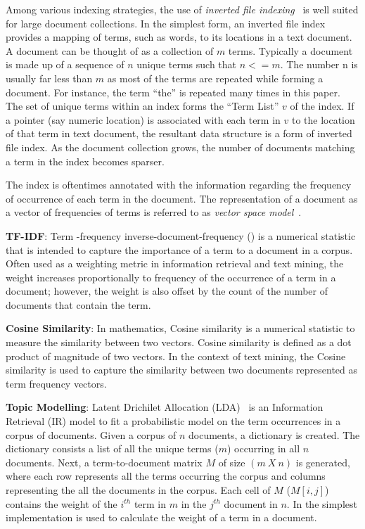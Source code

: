 Among various indexing strategies,
the use of \textit{inverted file indexing}~\cite{frakes1992introduction}
is well suited for large document collections.
In the simplest form, an inverted file index provides
a mapping of terms, such as words, to its locations in a text document.
A document can be thought of as a collection of $m$ terms.
Typically a document is made up of a sequence of $n$ unique terms
such that $n <= m$.
The number n is usually far less than
$m$ as most of the terms are repeated while forming a document. 
For instance, the term ``the'' is repeated many times in this paper.
The set of unique terms within an index forms
the ``Term List'' $v$ of the index.
If a pointer (say numeric location) is associated with each term in $v$ to the location
of that term in text document, the resultant data structure
is a form of inverted file index.
As the document collection grows,
the number of documents matching a term in the index becomes sparser.

The index is oftentimes annotated with the information regarding 
the frequency of occurrence of each term in the document. 
The representation of a document as a vector of frequencies
of terms is referred to as \textit{vector space model}~\cite{singhal2001modern,frakes1992introduction}.

\textbf{TF-IDF}\cite{manning2008introduction}:
Term -frequency inverse-document-frequency () is a numerical statistic that is intended to capture the importance of a term to a document in a corpus.
Often used as a weighting metric in information retrieval and text mining,
the  weight increases proportionally to frequency of the occurrence of a term in a document; however, the weight is also offset by the count of the number of documents that contain the term.

\textbf{Cosine Similarity}\cite{singhal2001modern}: In mathematics, Cosine similarity is a numerical statistic to measure the similarity between two vectors.
Cosine similarity is defined as a dot product of magnitude of two vectors.
In the context of text mining, the Cosine similarity is used to capture the similarity between two documents represented as term frequency vectors.

\textbf{Topic Modelling}: Latent Drichilet Allocation (LDA)~\cite{blei2003latent,panichella2013effectively} is an Information Retrieval (IR) 
model to fit a probabilistic model on the term occurrences in a corpus of documents.
Given a corpus of $n$ documents, a dictionary is created.
The dictionary consists a list of all the unique terms ($m$) occurring in all $n$ documents.
Next, a term-to-document matrix $M$ of size $(m\ X\ n)$ is generated, where each row represents all the terms occurring the corpus and columns representing the all the documents in the corpus.
Each cell of $M$ ($M[i,j]$) contains the weight of the $i^{th}$ term in $m$ in the $j^{th}$ document in $n$.
In the simplest implementation  is used to calculate the weight of a term in a document.



